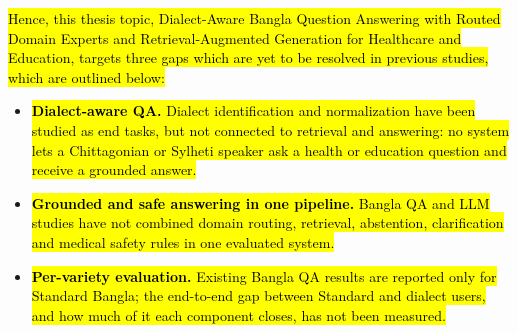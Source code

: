 \hl{Hence, this thesis topic, Dialect-Aware Bangla Question Answering
with Routed Domain Experts and Retrieval-Augmented Generation for
Healthcare and Education, targets three gaps which are yet to be
resolved in previous studies, which are outlined below:}

\begin{itemize}
\item \hl{\textbf{Dialect-aware QA.} Dialect identification and
normalization have been studied as end tasks, but not connected to
retrieval and answering: no system lets a Chittagonian or Sylheti
speaker ask a health or education question and receive a grounded
answer.}

\item \hl{\textbf{Grounded and safe answering in one pipeline.} Bangla QA
and LLM studies have not combined domain routing, retrieval, abstention,
clarification and medical safety rules in one evaluated system.}

\item \hl{\textbf{Per-variety evaluation.} Existing Bangla QA results are
reported only for Standard Bangla; the end-to-end gap between Standard
and dialect users, and how much of it each component closes, has not
been measured.}
\end{itemize}
